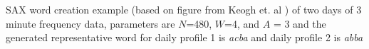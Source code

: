 SAX word creation example (based on figure from Keogh et. al \cite{keogh_hot_2005}) of two days of 3 minute frequency data, parameters are $N$=480, $W$=4, and $A$ = 3 and the generated representative word for daily profile 1 is \emph{acba} and daily profile 2 is \emph{abba} \cite{miller_automated_2015}
\label{fig:SAXWord}